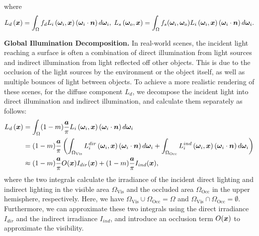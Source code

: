 \documentclass{article} %
\begin{document}
where
\begin{equation}
    L_d\left({\bm{x}}\right) =\int_{\Omega} f_d L_i\left(\boldsymbol{\omega}_i, {\bm{x}}\right)\left(\boldsymbol{\omega}_i \cdot {\bm{n}}\right) d \boldsymbol{\omega}_i,\; L_s\left(\boldsymbol{\omega}_o, {\bm{x}}\right)=\int_{\Omega} f_s(\bm{\omega}_i, \bm{\omega}_o) L_i\left(\boldsymbol{\omega}_i, {\bm{x}}\right)\left(\boldsymbol{\omega}_i \cdot {\bm{n}}\right) d \boldsymbol{\omega}_i.
\end{equation}

\textbf{Global Illumination Decomposition.} In real-world scenes, the incident light reaching a surface is often a combination of direct illumination from light sources and indirect illumination from light reflected off other objects. This is due to the occlusion of the light sources by the environment or the object itself, as well as multiple bounces of light between objects. To achieve a more realistic rendering of these scenes, for the diffuse component $L_d$, we decompose the incident light into direct illumination and indirect illumination, and calculate them separately as follows:
\begin{equation}\label{decompose}
\begin{aligned}
L_d\left({\bm{x}}\right) &=\int_{\Omega} (1-m) \frac{\boldsymbol{a}}{\pi} L_i\left(\boldsymbol{\omega}_i, {\bm{x}}\right)\left(\boldsymbol{\omega}_i \cdot {\bm{n}}\right) d \boldsymbol{\omega}_i\\
&= (1-m) \frac{\boldsymbol{a}}{\pi} \left(\int_{\Omega_{\mathrm{Vis}}} L^{dir}_i\left(\boldsymbol{\omega}_i, {\bm{x}}\right)\left(\boldsymbol{\omega}_i \cdot {\bm{n}}\right) d \boldsymbol{\omega}_i + \int_{\Omega_{\mathrm{Occ}}} L^{ind}_i\left(\boldsymbol{\omega}_i, {\bm{x}}\right)\left(\boldsymbol{\omega}_i \cdot {\bm{n}}\right) d \boldsymbol{\omega}_i\right)\\
&\approx (1-m) \frac{\boldsymbol{a}}{\pi} O({\bm{x}}) I_{dir}({\bm{x}}) + (1-m) \frac{\boldsymbol{a}}{\pi} I_{ind}({\bm{x}}),
\end{aligned}
\end{equation}
where the two integrals calculate the irradiance of the incident direct lighting and indirect lighting in the visible area $\Omega_{\mathrm{Vis}}$ and the occluded area $\Omega_{\mathrm{Occ}}$ in the upper hemisphere, respectively. Here, we have $\Omega_{\mathrm{Vis}} \cup \Omega_{\mathrm{Occ}} = \Omega$ and $\Omega_{\mathrm{Vis}} \cap \Omega_{\mathrm{Occ}} = \emptyset$. Furthermore, we can approximate these two integrals using the direct irradiance $I_{dir}$ and the indirect irradiance $I_{ind}$, and introduce an occlusion term $O({\bm{x}})$ to approximate the visibility. 
\end{document}
